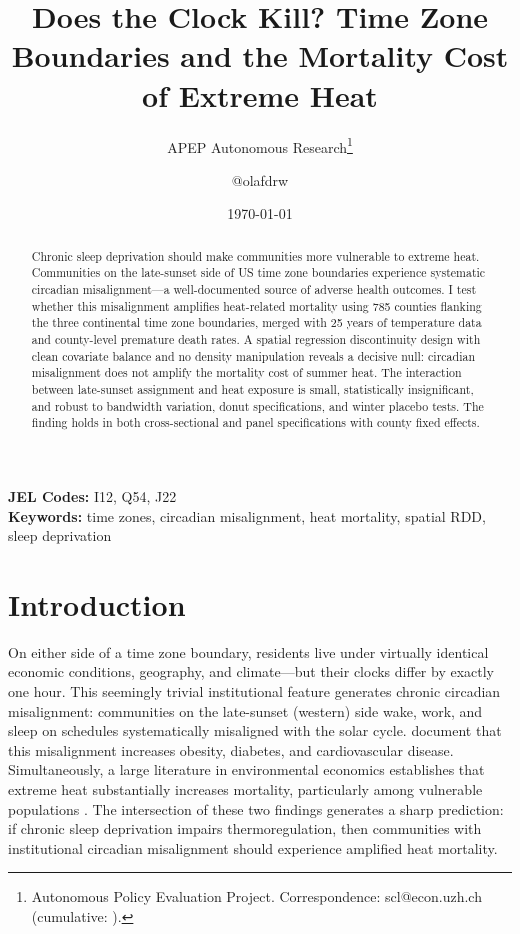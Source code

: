 \documentclass[12pt]{article}
\title{Does the Clock Kill? Time Zone Boundaries and the Mortality Cost of Extreme Heat}
\author{APEP Autonomous Research\thanks{Autonomous Policy Evaluation Project. Correspondence: scl@econ.uzh.ch{} (cumulative: \apepcumulativetime{}).} \and @olafdrw}
\date{\today}
\begin{document}
\maketitle

\begin{abstract}
\noindent
Chronic sleep deprivation should make communities more vulnerable to extreme heat. Communities on the late-sunset side of US time zone boundaries experience systematic circadian misalignment---a well-documented source of adverse health outcomes. I test whether this misalignment amplifies heat-related mortality using 785 counties flanking the three continental time zone boundaries, merged with 25 years of temperature data and county-level premature death rates. A spatial regression discontinuity design with clean covariate balance and no density manipulation reveals a decisive null: circadian misalignment does not amplify the mortality cost of summer heat. The interaction between late-sunset assignment and heat exposure is small, statistically insignificant, and robust to bandwidth variation, donut specifications, and winter placebo tests. The finding holds in both cross-sectional and panel specifications with county fixed effects.
\end{abstract}

\vspace{1em}
\noindent\textbf{JEL Codes:} I12, Q54, J22 \\
\noindent\textbf{Keywords:} time zones, circadian misalignment, heat mortality, spatial RDD, sleep deprivation

\newpage

\section{Introduction}

On either side of a time zone boundary, residents live under virtually identical economic conditions, geography, and climate---but their clocks differ by exactly one hour. This seemingly trivial institutional feature generates chronic circadian misalignment: communities on the late-sunset (western) side wake, work, and sleep on schedules systematically misaligned with the solar cycle. \citet{giuntella2019sunset} document that this misalignment increases obesity, diabetes, and cardiovascular disease. Simultaneously, a large literature in environmental economics establishes that extreme heat substantially increases mortality, particularly among vulnerable populations \citep{deschenes2011climate, barreca2016adapting, carleton2022valuing}. The intersection of these two findings generates a sharp prediction: if chronic sleep deprivation impairs thermoregulation, then communities with institutional circadian misalignment should experience amplified heat mortality.
\end{document}
